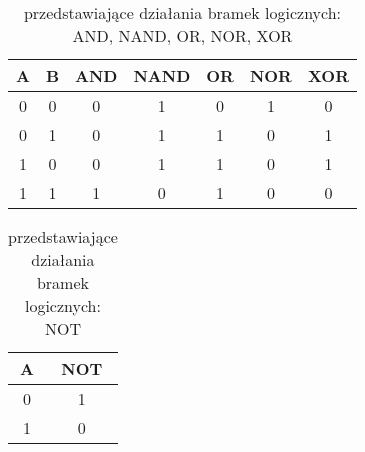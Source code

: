 \documentclass[a4paper]{article}
\begin{document}
\begin{table}[h]
\centering\caption{przedstawiające działania bramek logicznych: AND, NAND, OR, NOR, XOR}
\begin{tabular}{c c| c c c c c}
\hline
\hline
A & B & AND & NAND & OR & NOR & XOR \\
\hline
0 & 0 & 0 & 1 & 0 & 1 & 0\\
0 & 1 & 0 & 1 & 1 & 0 & 1\\
1 & 0 & 0 & 1 & 1 & 0 & 1\\
1 & 1 & 1 & 0 & 1 & 0 & 0\\
\hline
\hline
\end{tabular}
\end{table}

\begin{table}[h]
\centering\caption{przedstawiające działania bramek logicznych: NOT}
\begin{tabular}{c| c}
\hline
\hline
A & NOT \\
\hline
0 & 1\\
1 & 0\\

\hline
\hline
\end{tabular}
\end{table}
\end{document}
